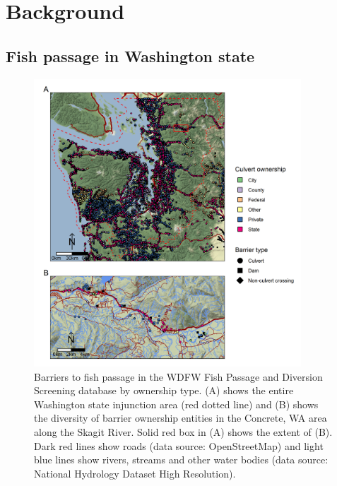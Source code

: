 \documentclass[12pt]{elsarticle}
\begin{document}
\clearpage
%
\section{Background}

\subsection{Fish passage in Washington state}


\begin{figure}
\includegraphics[width=10cm]{figures/fig_mapconcrete.png}
\caption{Barriers to fish passage in the WDFW Fish Passage and Diversion Screening database by ownership type. (A) shows the entire Washington state injunction area (red dotted line) and (B) shows the diversity of barrier ownership entities in the Concrete, WA area along the Skagit River. Solid red box in (A) shows the extent of (B). Dark red lines show roads (data source: OpenStreetMap) and light blue lines show rivers, streams and other water bodies (data source: National Hydrology Dataset High Resolution).\label{fig:barrierMap}}
\end{figure}%
\end{document}
